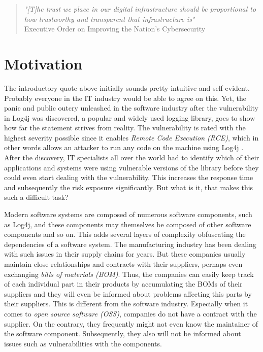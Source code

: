 
\pagestyle{fancy-style}

\begin{quote}
	\emph{"[T]he trust we place in our digital infrastructure should be proportional to how trustworthy and transparent that infrastructure is"}\\
	Executive Order on Improving the Nation's Cybersecurity \cite{ExecutiveOrderSBOM}
\end{quote}

\section{Motivation}
The introductory quote above initially sounds pretty intuitive and self evident. Probably everyone in the IT industry would be able to agree on this. Yet, the panic and public outcry unleashed in the software industry after the vulnerability in Log4j was discovered, a popular and widely used logging library, goes to show how far the statement strives from reality. The vulnerability is rated with the highest severity possible since it enables \textit{Remote Code Execution (RCE)}, which in other words allows an attacker to run any code on the machine using Log4j \cite{Log4jVuln}. After the discovery, IT specialists all over the world had to identify which of their applications and systems were using vulnerable versions of the library before they could even start dealing with the vulnerability. This increases the response time and subsequently the risk exposure significantly. But what is it, that makes this such a difficult task?\par
Modern software systems are composed of numerous software components, such as Log4j, and these components may themselves be composed of other software components and so on. This adds several layers of complexity obfuscating the dependencies of a software system. The manufacturing industry has been dealing with such issues in their supply chains for years. But these companies usually maintain close relationships and contracts with their suppliers, perhaps even exchanging \textit{bills of materials (BOM)}. Thus, the companies can easily keep track of each individual part in their products by accumulating the BOMs of their suppliers and they will even be informed about problems affecting this parts by their suppliers. This is different from the software industry. Especially when it comes to \textit{open source software (OSS)}, companies do not have a contract with the supplier. On the contrary, they frequently might not even know the maintainer of the software component. Subsequently, they also will not be informed about issues such as vulnerabilities with the components.\par
